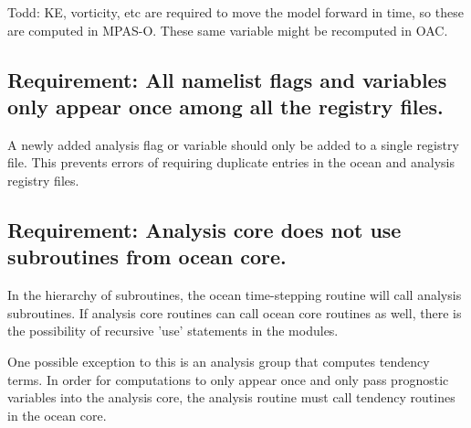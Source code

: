 \documentclass[11pt]{report}
\begin{document}
Todd: KE, vorticity, etc are required to move the model forward in time, so these are computed in MPAS-O. These same variable might be recomputed in OAC.

\subsection{{\color{green} Requirement:} All namelist flags and variables only appear once among all the registry files.}
A newly added analysis flag or variable should only be added to a single registry file.  This prevents errors of requiring duplicate entries in the ocean and analysis registry files.

\subsection{{\color{red} Requirement:} Analysis core does not use subroutines from ocean core.}
In the hierarchy of subroutines, the ocean time-stepping routine will call analysis subroutines.  If analysis core routines can call ocean core routines as well, there is the possibility of recursive 'use' statements in the modules.

One possible exception to this is an analysis group that computes tendency terms.  In order for computations to only appear once and only pass prognostic variables into the analysis core, the analysis routine must call tendency routines in the ocean core.




\end{document}
